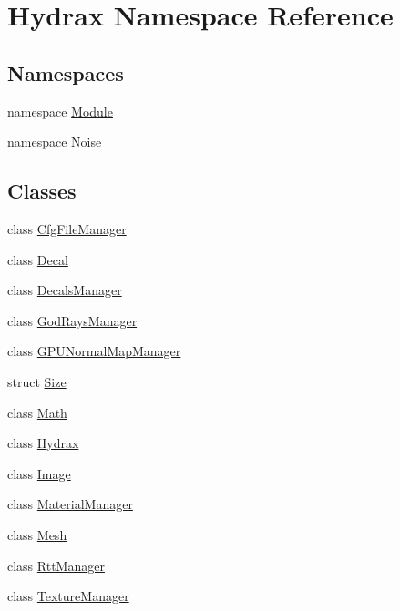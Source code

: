\hypertarget{namespace_hydrax}{
\section{Hydrax Namespace Reference}
\label{namespace_hydrax}
}
\subsection*{Namespaces}
\begin{CompactItemize}
\item 
namespace \hyperlink{namespace_hydrax_1_1_module}{Module}
\item 
namespace \hyperlink{namespace_hydrax_1_1_noise}{Noise}
\end{CompactItemize}
\subsection*{Classes}
\begin{CompactItemize}
\item 
class \hyperlink{class_hydrax_1_1_cfg_file_manager}{CfgFileManager}
\item 
class \hyperlink{class_hydrax_1_1_decal}{Decal}
\item 
class \hyperlink{class_hydrax_1_1_decals_manager}{DecalsManager}
\item 
class \hyperlink{class_hydrax_1_1_god_rays_manager}{GodRaysManager}
\item 
class \hyperlink{class_hydrax_1_1_g_p_u_normal_map_manager}{GPUNormalMapManager}
\item 
struct \hyperlink{struct_hydrax_1_1_size}{Size}
\item 
class \hyperlink{class_hydrax_1_1_math}{Math}
\item 
class \hyperlink{class_hydrax_1_1_hydrax}{Hydrax}
\item 
class \hyperlink{class_hydrax_1_1_image}{Image}
\item 
class \hyperlink{class_hydrax_1_1_material_manager}{MaterialManager}
\item 
class \hyperlink{class_hydrax_1_1_mesh}{Mesh}
\item 
class \hyperlink{class_hydrax_1_1_rtt_manager}{RttManager}
\item 
class \hyperlink{class_hydrax_1_1_texture_manager}{TextureManager}
\end{CompactItemize}

